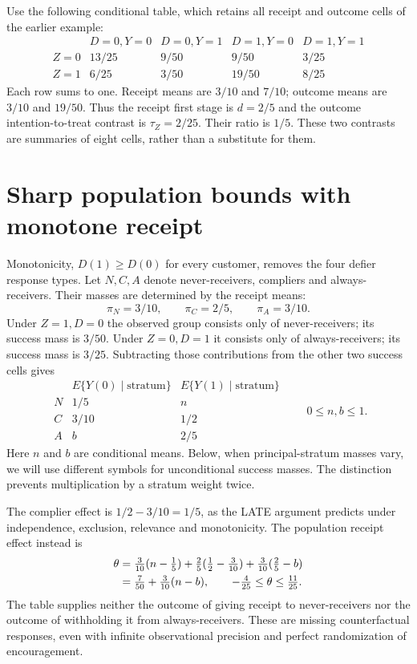 Use the following conditional table, which retains all receipt and outcome
cells of the earlier example:
\[
\begin{array}{c|rrrr}
 &D=0,Y=0&D=0,Y=1&D=1,Y=0&D=1,Y=1\\ \hline
 Z=0&13/25&9/50&9/50&3/25\\
 Z=1&6/25&3/50&19/50&8/25
\end{array}
\]
Each row sums to one. Receipt means are $3/10$ and $7/10$; outcome
means are $3/10$ and $19/50$. Thus the receipt first stage is
$d=2/5$ and the outcome intention-to-treat contrast is
$\tau_Z=2/25$. Their ratio is $1/5$. These two contrasts are summaries
of eight cells, rather than a substitute for them.

\section{Sharp population bounds with monotone receipt}
\label{exec17:s3-monotone-polytope}

Monotonicity, $D(1)\geq D(0)$ for every customer, removes the four
defier response types. Let $N,C,A$ denote never-receivers, compliers and
always-receivers. Their masses are determined by the receipt means:
\[
 \pi_N=3/10,\qquad \pi_C=2/5,\qquad \pi_A=3/10.
\]
Under $Z=1,D=0$ the observed group consists only of never-receivers;
its success mass is $3/50$. Under $Z=0,D=1$ it consists only of
always-receivers; its success mass is $3/25$. Subtracting those
contributions from the other two success cells gives
\[
\begin{array}{c|cc}
 &E\{Y(0)\mid\text{stratum}\}&E\{Y(1)\mid\text{stratum}\}\\ \hline
 N&1/5&n\\
 C&3/10&1/2\\
 A&b&2/5
\end{array}
\qquad 0\leq n,b\leq1 .
\]
Here $n$ and $b$ are conditional means. Below, when principal-stratum
masses vary, we will use different symbols for unconditional success
masses. The distinction prevents multiplication by a stratum weight twice.

The complier effect is $1/2-3/10=1/5$, as the LATE argument predicts
under independence, exclusion, relevance and
monotonicity.\citep{angrist1996}
The population receipt effect instead is
\begin{align}
 \theta
 &=\tfrac{3}{10}(n-\tfrac15)
   +\tfrac25(\tfrac12-\tfrac3{10})
   +\tfrac3{10}(\tfrac25-b) \notag\\
 &=\tfrac7{50}+\tfrac3{10}(n-b),
 \qquad
 -\tfrac4{25}\leq\theta\leq\tfrac{11}{25}.
 \label{exec17:s3-monotone-ate}
\end{align}
The table supplies neither the outcome of giving receipt to never-receivers
nor the outcome of withholding it from always-receivers.
These are missing counterfactual responses, even with infinite observational
precision and perfect randomization of encouragement.

